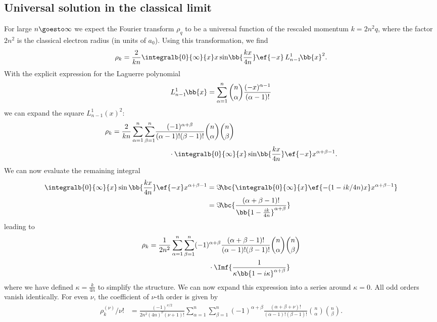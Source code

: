 \subsection{Universal solution in the classical limit}
For large $n \goesto \infty$ we expect the Fourier transform $\rho_q$ to be a universal function of the rescaled momentum $k=2n^2 q$, where the factor $2n^2$ is the classical electron radius (in units of $a_0$). Using this transformation, we find
\begin{align}
\rho_k = \frac{2}{k n}\integralb{0}{\infty}{x} x \sin\!\bb{\frac{kx}{4n}} \ef{-x} \, L_{n-1}^1\!\bb{x}^2.
\end{align}
With the explicit expression for the Laguerre polynomial
\begin{align}
L_{n-1}^1\!\bb{x}=\sum_{\alpha=1}^{n} \binom{n}{\alpha} \frac{(-x)^{\alpha-1}}{(\alpha-1)!}
\end{align}
we can expand the square $L^1_{n-1}(x)^2$:
\begin{align}
    \rho_k=\frac{2}{k n} \sum_{\alpha=1}^{n}\sum_{\beta=1}^{n} &\frac{(-1)^{\alpha+\beta}}{(\alpha-1)! (\beta-1)!} \binom{n}{\alpha}\binom{n}{\beta} \\
&\qquad\cdot \integralb{0}{\infty}{x} \sin\!\bb{\frac{kx}{4n}} \ef{-x} x^{\alpha+\beta-1}.
\end{align}
We can now evaluate the remaining integral
\begin{align}
    \integralb{0}{\infty}{x} \sin\bb{\frac{kx}{4n}} \ef{-x} x^{\alpha+\beta-1} &= \Im\!\bc{ \integralb{0}{\infty}{x} \ef{-(1-ik /4n)x} x^{\alpha+\beta-1}} \\
    &= \Im\!\bc{ \frac{(\alpha+\beta-1)!}{\bb{1-\frac{i k}{4n}}^{\alpha+\beta}} }
\end{align}
leading to
\begin{align}
    \rho_k=\frac{1}{2n^2} \sum_{\alpha=1}^{n}\sum_{\beta=1}^{n} &(-1)^{\alpha+\beta} \frac{(\alpha+\beta-1)!}{(\alpha-1)! (\beta-1)!} \binom{n}{\alpha}\binom{n}{\beta} \\
    &\qquad\cdot \Imf{ \frac{1}{\kappa\bb{ 1-i\kappa }^{\alpha+\beta}} }
\end{align}
where we have defined $\kappa=\frac{k}{4n}$ to simplify the structure.
We can now expand this expression into a series around $\kappa=0$.
All odd orders vanish identically.
For even $\nu$, the coefficient of $\nu$-th order is given by
\begin{align}
\rho^{(\nu)}_k/\nu! &=\frac{(-1)^{\nu/2}}{2n^2 (4n)^\nu (\nu+1)!} \sum_{\alpha=1}^{n}\sum_{\beta=1}^{n} (-1)^{\alpha+\beta} \frac{(\alpha+\beta+\nu)!}{(\alpha-1)! (\beta-1)!} \binom{n}{\alpha}\binom{n}{\beta}.
\end{align}
